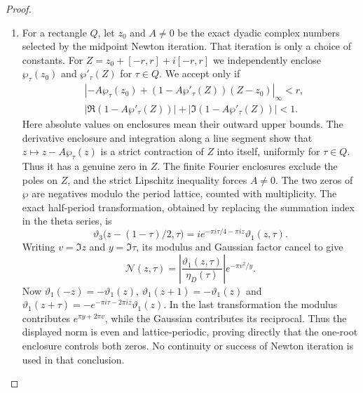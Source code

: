 \begin{proof}
\begin{enumerate}[label=\arabic*.,leftmargin=*]
\item For a rectangle $Q$, let $z_0$ and $A\ne0$ be the exact dyadic complex
numbers selected by the midpoint Newton iteration. That iteration is
only a choice of constants. For $Z=z_0+[-r,r]+i[-r,r]$ we independently
enclose $\wp_\tau(z_0)$ and $\wp'_\tau(Z)$ for $\tau\in Q$.
We accept only if
\[
 \begin{split}
 &\left|-A\wp_\tau(z_0)
 +(1-A\wp'_\tau(Z))(Z-z_0)\right|_\infty<r,\\
 &|\Re(1-A\wp'_\tau(Z))|
       +|\Im(1-A\wp'_\tau(Z))|<1.
 \end{split}
\]
Here absolute values on enclosures mean their outward upper bounds.
The derivative enclosure and integration along a line segment show
that $z\mapsto z-A\wp_\tau(z)$ is a strict contraction of $Z$ into
itself, uniformly for $\tau\in Q$. Thus it has a genuine zero in $Z$.
The finite Fourier enclosures exclude the poles on $Z$, and the strict
Lipschitz inequality forces $A\ne0$. The two zeros of $\wp$ are
negatives modulo the period lattice, counted with multiplicity. The
exact half-period transformation, obtained by replacing the summation
index in the theta series, is
\[
 \vartheta_3\bigl(z-(1-\tau)/2,\tau\bigr)
   =i e^{-\pi i\tau/4-\pi i z}\vartheta_1(z,\tau).
\]
Writing $v=\Im z$ and $y=\Im\tau$, its modulus and Gaussian factor
cancel to give
\[
 \mathcal N(z,\tau)=
 \left|\frac{\vartheta_1(z,\tau)}{\eta_D(\tau)}\right|
 e^{-\pi v^2/y}.
\]
Now $\vartheta_1(-z)=-\vartheta_1(z)$,
$\vartheta_1(z+1)=-\vartheta_1(z)$ and
$\vartheta_1(z+\tau)=-e^{-\pi i\tau-2\pi i z}\vartheta_1(z)$.
In the last transformation the modulus contributes
$e^{\pi y+2\pi v}$, while the Gaussian contributes its reciprocal.
Thus the displayed norm is even and lattice-periodic, proving directly
that the one-root enclosure controls both zeros. No continuity or
success of Newton iteration is used in that conclusion.


\end{enumerate}
\end{proof}
